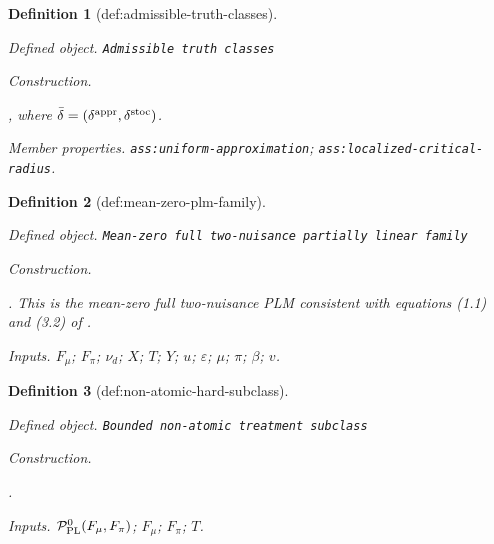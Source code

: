 \documentclass{article}
\newtheorem{definition}{Definition}
\begin{document}
\begin{definition}[def:admissible-truth-classes]\label{def:admissible-truth-classes}
\par\smallskip\noindent\emph{Defined object.} \texttt{Admissible truth classes}
\par\smallskip\noindent\emph{Construction.} \par\noindent {}\par\noindent, where \(\bar\delta=(\delta^{\rm appr},\delta^{\rm stoc})\).
\par\smallskip\noindent\emph{Member properties.} \texttt{ass:\allowbreak{}uniform-\allowbreak{}approximation}; \texttt{ass:\allowbreak{}localized-\allowbreak{}critical-\allowbreak{}radius}.
\end{definition}

\begin{definition}[def:mean-zero-plm-family]\label{def:mean-zero-plm-family}
\par\smallskip\noindent\emph{Defined object.} \texttt{Mean-\allowbreak{}zero full two-\allowbreak{}nuisance partially linear family}
\par\smallskip\noindent\emph{Construction.} \par\noindent {}\par\noindent. This is the mean-zero full two-nuisance PLM consistent with equations (1.1) and (3.2) of \cite{gu2026optimally}.
\par\smallskip\noindent\emph{Inputs.} \(F_\mu\); \(F_\pi\); \(\nu_d\); \(X\); \(T\); \(Y\); \(u\); \(\varepsilon\); \(\mu\); \(\pi\); \(\beta\); \(v\).
\end{definition}

\begin{definition}[def:non-atomic-hard-subclass]\label{def:non-atomic-hard-subclass}
\par\smallskip\noindent\emph{Defined object.} \texttt{Bounded non-\allowbreak{}atomic treatment subclass}
\par\smallskip\noindent\emph{Construction.} \par\noindent {}\par\noindent.
\par\smallskip\noindent\emph{Inputs.} \(\mathcal P_{\rm PL}^{0}(F_\mu,F_\pi)\); \(F_\mu\); \(F_\pi\); \(T\).
\end{definition}
\end{document}
